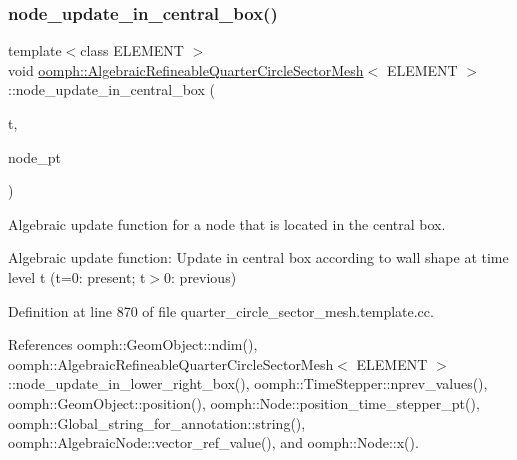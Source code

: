 \mbox{\label{classoomph_1_1AlgebraicRefineableQuarterCircleSectorMesh_a89dc4a592e3f188f9bfbffd5c7fdbbcc}} 
\subsubsection{\texorpdfstring{node\+\_\+update\+\_\+in\+\_\+central\+\_\+box()}{node\_update\_in\_central\_box()}}
{\footnotesize\ttfamily template$<$class E\+L\+E\+M\+E\+NT $>$ \\
void \hyperlink{classoomph_1_1AlgebraicRefineableQuarterCircleSectorMesh}{oomph\+::\+Algebraic\+Refineable\+Quarter\+Circle\+Sector\+Mesh}$<$ E\+L\+E\+M\+E\+NT $>$\+::node\+\_\+update\+\_\+in\+\_\+central\+\_\+box (\begin{DoxyParamCaption}\item[{const unsigned \&}]{t,  }\item[{\hyperlink{classoomph_1_1AlgebraicNode}{Algebraic\+Node} $\ast$\&}]{node\+\_\+pt }\end{DoxyParamCaption})\hspace{0.3cm}{\ttfamily [private]}}



Algebraic update function for a node that is located in the central box. 

Algebraic update function\+: Update in central box according to wall shape at time level t (t=0\+: present; t$>$0\+: previous) 

Definition at line 870 of file quarter\+\_\+circle\+\_\+sector\+\_\+mesh.\+template.\+cc.



References oomph\+::\+Geom\+Object\+::ndim(), oomph\+::\+Algebraic\+Refineable\+Quarter\+Circle\+Sector\+Mesh$<$ E\+L\+E\+M\+E\+N\+T $>$\+::node\+\_\+update\+\_\+in\+\_\+lower\+\_\+right\+\_\+box(), oomph\+::\+Time\+Stepper\+::nprev\+\_\+values(), oomph\+::\+Geom\+Object\+::position(), oomph\+::\+Node\+::position\+\_\+time\+\_\+stepper\+\_\+pt(), oomph\+::\+Global\+\_\+string\+\_\+for\+\_\+annotation\+::string(), oomph\+::\+Algebraic\+Node\+::vector\+\_\+ref\+\_\+value(), and oomph\+::\+Node\+::x().



